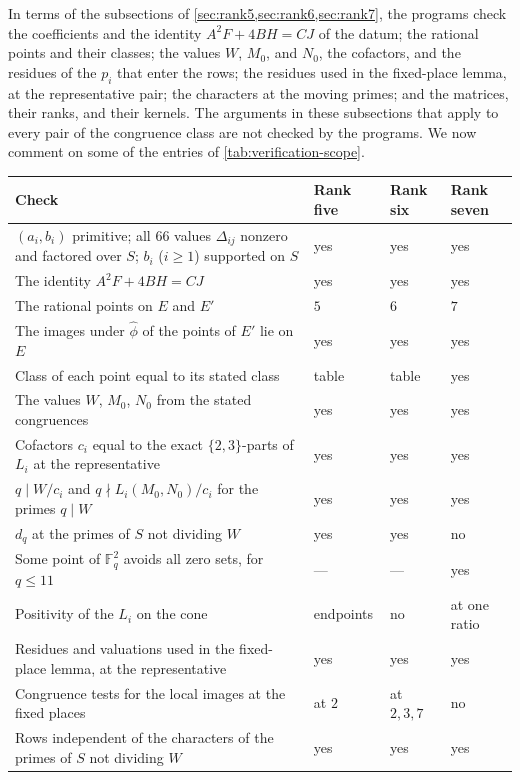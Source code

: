\documentclass[12pt,oneside,openany]{book}
\theoremstyle{definition}
\theoremstyle{plain}
\numberwithin{equation}{chapter}
\theoremstyle{plain}
\theoremstyle{definition}
\theoremstyle{remark}
\newcommand{\F}{\mathbb F}
\newcommand{\dual}{\hat\phi}
\begin{document}
In terms of the subsections of \cref{sec:rank5,sec:rank6,sec:rank7}, the programs check the coefficients and the identity $A^2F+4BH=CJ$ of the datum; the rational points and their classes; the values $W$, $M_0$, and $N_0$, the cofactors, and the residues of the $p_i$ that enter the rows; the residues used in the fixed-place lemma, at the representative pair; the characters at the moving primes; and the matrices, their ranks, and their kernels. The arguments in these subsections that apply to every pair of the congruence class are not checked by the programs. We now comment on some of the entries of \cref{tab:verification-scope}.

\begin{table}[!htbp]
\centering\small
\begin{tabular}{@{}p{}p{}p{}p{}@{}}
\toprule
Check & Rank five & Rank six & Rank seven\\
\midrule
$(a_i,b_i)$ primitive; all $66$ values $\Delta_{ij}$ nonzero and factored over $S$; $b_i$ ($i\ge1$) supported on $S$ & yes & yes & yes\\
The identity $A^2F+4BH=CJ$ & yes & yes & yes\\
The rational points on $E$ and $E'$ & $5$ & $6$ & $7$\\
The images under $\dual$ of the points of $E'$ lie on $E$ & yes & yes & yes\\
Class of each point equal to its stated class & table & table & yes\\
The values $W$, $M_0$, $N_0$ from the stated congruences & yes & yes & yes\\
Cofactors $c_i$ equal to the exact $\{2,3\}$-parts of $L_i$ at the representative & yes & yes & yes\\
$q\mid W/c_i$ and $q\nmid L_i(M_0,N_0)/c_i$ for the primes $q\mid W$ & yes & yes & yes\\
$d_q$ at the primes of $S$ not dividing $W$ & yes & yes & no\\
Some point of $\F_q^2$ avoids all zero sets, for $q\le11$ & --- & --- & yes\\
Positivity of the $L_i$ on the cone & endpoints & no & at one ratio\\
Residues and valuations used in the fixed-place lemma, at the representative & yes & yes & yes\\
Congruence tests for the local images at the fixed places & at $2$ & at $2,3,7$ & no\\
Rows independent of the characters of the primes of $S$ not dividing $W$ & yes & yes & yes\\

\end{tabular}
\end{table}
\end{document}
